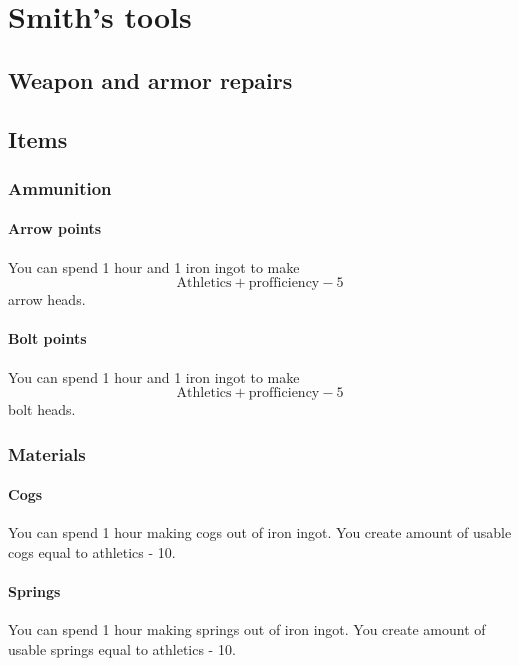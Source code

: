 \chapter{Smith's tools}

\section{Weapon and armor repairs}

\section{Items}

\subsection{Ammunition}

\subsubsection{Arrow points}

You can spend 1 hour and 1 iron ingot to make $$\mathrm{Athletics} + \mathrm{profficiency} - 5$$ arrow heads.

\subsubsection{Bolt points}

You can spend 1 hour and 1 iron ingot to make $$\mathrm{Athletics} + \mathrm{profficiency} - 5$$ bolt heads.

\subsection{Materials}

\subsubsection{Cogs}

You can spend 1 hour making cogs out of iron ingot. You create amount of usable cogs equal to athletics - 10.

\subsubsection{Springs}

You can spend 1 hour making springs out of iron ingot. You create amount of usable springs equal to athletics - 10.
